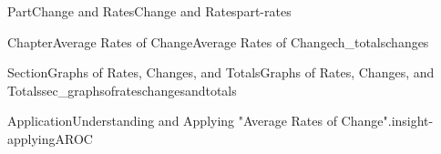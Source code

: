 \documentclass{tufte-book}
\numberwithin{equation}{chapter}
\def \tikzhistogram (#1,#2){\draw[fill=blue,opacity=0.3] ({#1+((\xtwo-\xmin)/5)},#2) rectangle ({#1-((\xtwo-\xmin)/5)},0); \draw[draw,thick] ({#1+((\xtwo-\xmin)/5)},#2) rectangle ({#1-((\xtwo-\xmin)/5)},0); \node[draw,fill=blue, circle,inner sep=2.5pt] at (#1,#2) {};}
\begin{document}
\begin{partptx}{Part}{Change and Rates}{}{Change and Rates}{}{}{part-rates}
\begin{chapterptx}{Chapter}{Average Rates of Change}{}{Average Rates of Change}{}{}{ch_totalschanges}
\begin{sectionptx}{Section}{Graphs of Rates, Changes, and Totals}{}{Graphs of Rates, Changes, and Totals}{}{}{sec_graphsofrateschangesandtotals}
\begin{insight}{Application}{Understanding and Applying "Average Rates of Change".}{insight-applyingAROC}
\begin{image}{0.3}{0.4}{0.3}{}
{}
\end{image}
\end{insight}
\end{sectionptx}
\end{chapterptx}
\end{partptx}
\end{document}
